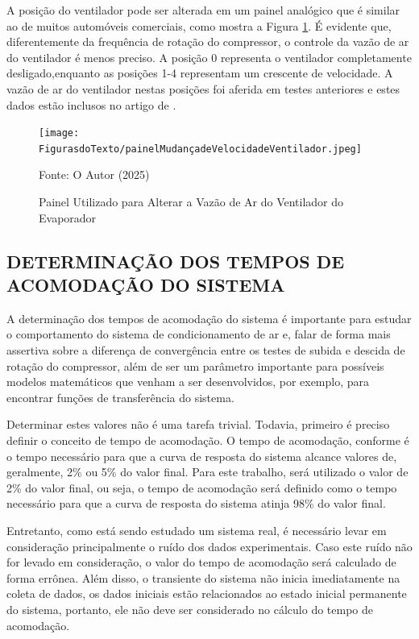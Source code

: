 A posição do ventilador pode ser alterada em um painel analógico que é similar ao de muitos automóveis comerciais, como mostra a Figura \ref{fig:painelMudançadeVelocidadeVentilador}. É evidente que, diferentemente da frequência de rotação do compressor, o controle da vazão de ar do ventilador é menos preciso. A posição 0 representa o ventilador completamente desligado,enquanto as posições 1-4 representam um crescente de velocidade. A vazão de ar do ventilador nestas posições foi aferida em testes anteriores e estes dados estão inclusos no artigo de \textcite{ExperimentalThermalPerformance}.
\newpage
\begin{figure}[h]
    \centering
    \texttt{[image: FigurasdoTexto/painelMudançadeVelocidadeVentilador.jpeg]}
    \caption{Painel Utilizado para Alterar a Vazão de Ar do Ventilador do Evaporador}
    \label{fig:painelMudançadeVelocidadeVentilador}

    {\footnotesize Fonte: O Autor (2025)}

\end{figure}

\subsection{\MakeUppercase{Determinação dos Tempos de Acomodação do Sistema}} \label{subsec:Tempo de Acomodação do Sistema}

A determinação dos tempos de acomodação do sistema é importante para estudar o comportamento do sistema de condicionamento de ar e, falar
 de forma mais assertiva sobre a diferença de convergência entre os testes de subida e descida de rotação do compressor, além de ser um parâmetro importante para possíveis modelos matemáticos que venham a ser desenvolvidos, por exemplo, para encontrar funções de transferência do sistema. 

Determinar estes valores não é uma tarefa trivial. Todavia, primeiro é preciso definir o conceito de tempo de acomodação. O tempo de acomodação, conforme \textcite{ogataControle} é o tempo necessário para que a curva de resposta do sistema alcance valores de, geralmente, 2\% ou 5\% do valor final. Para este trabalho, será utilizado o valor de 2\% do valor final, ou seja, o tempo de acomodação será definido como o tempo necessário para que a curva de resposta do sistema atinja 98\% do valor final.

Entretanto, como está sendo estudado um sistema real, é necessário levar em consideração principalmente o ruído dos dados experimentais. Caso este ruído não for levado em consideração, o valor do tempo de acomodação será calculado de forma errônea. Além disso, o transiente do sistema não inicia imediatamente na coleta de dados, os dados iniciais estão relacionados ao estado inicial permanente do sistema, portanto, ele não deve ser considerado no cálculo do tempo de acomodação. 

